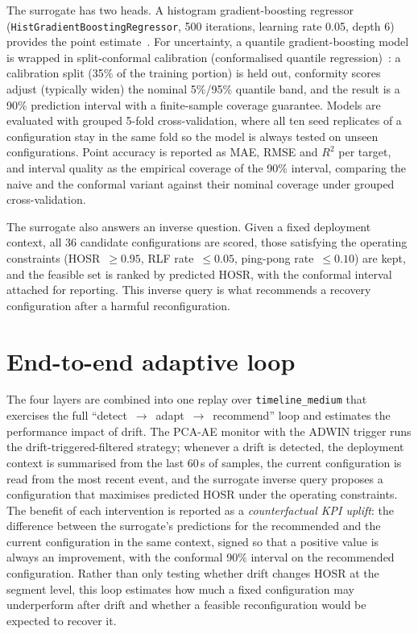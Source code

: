 The surrogate has two heads. A histogram gradient-boosting regressor
(\texttt{HistGradient\-Boosting\-Regressor}, 500 iterations, learning rate 0.05,
depth 6) provides the point estimate~\cite{pedregosa2011scikit}. For
uncertainty, a quantile gradient-boosting model is wrapped in split-conformal
calibration (conformalised quantile regression)~\cite{romano2019cqr}: a
calibration split (35\% of the training portion) is held out, conformity scores
adjust (typically widen) the nominal 5\%/95\% quantile band, and the result is a 90\% prediction
interval with a finite-sample coverage guarantee. Models are evaluated with
grouped 5-fold cross-validation, where all ten seed replicates of a
configuration stay in the same fold so the model is always tested on unseen
configurations. Point accuracy is reported as MAE, RMSE and $R^2$ per target,
and interval quality as the empirical coverage of the 90\% interval, comparing
the naive and the conformal variant against their nominal coverage under grouped
cross-validation.

The surrogate also answers an inverse question. Given a fixed deployment context,
all 36 candidate configurations are scored, those satisfying the operating
constraints (HOSR~$\geq0.95$, RLF rate~$\leq0.05$, ping-pong rate~$\leq0.10$)
are kept, and the feasible set is ranked by predicted HOSR, with the conformal
interval attached for reporting. This inverse query is what recommends a
recovery configuration after a harmful reconfiguration.

\section{End-to-end adaptive loop}
\label{sec:end2end}

The four layers are combined into one replay over \texttt{timeline\_medium} that
exercises the full ``detect~$\rightarrow$~adapt~$\rightarrow$~recommend'' loop and
estimates the performance impact of drift. The PCA-AE monitor with the
ADWIN trigger runs the drift-triggered-filtered strategy; whenever a drift is
detected, the deployment context is summarised from the last 60\,s of samples,
the current configuration is read from the most recent event, and the surrogate
inverse query proposes a configuration that maximises predicted HOSR under the
operating constraints. The benefit of each intervention is reported as a
\emph{counterfactual KPI uplift}: the difference between the surrogate's
predictions for the recommended and the current configuration in the same
context, signed so that a positive value is always an improvement, with the
conformal 90\% interval on the recommended configuration. Rather than only
testing whether drift changes HOSR at the segment level, this loop estimates how
much a fixed configuration may underperform after drift and whether a feasible
reconfiguration would be expected to recover it.

